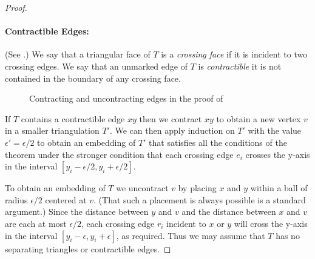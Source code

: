 \documentclass{patmorin}
\begin{document}
\begin{proof}
   \paragraph{Contractible Edges:}
   (See .)
   We say that a triangular face of $T$ is a \emph{crossing
   face} if it is incident to two crossing edges.  We say that an
   unmarked edge of $T$ is \emph{contractible} it is not contained
   in the boundary of any crossing face.  
   \begin{figure}
      \caption{Contracting and uncontracting edges in the proof of
      }
   \end{figure}

   If $T$ contains a contractible edge $xy$ then we contract $xy$ to
   obtain a new vertex $v$ in a smaller triangulation $T'$.   We can then apply
   induction on $T'$ with the value $\epsilon'=\epsilon/2$ to obtain an
   embedding of $T'$ that satisfies all the conditions of the theorem under
   the stronger condition that each crossing edge $e_i$ crosses
   the y-axis in the interval $[y_i-\epsilon/2,y_i+\epsilon/2]$.

   To obtain an embedding of $T$ we uncontract $v$ by placing $x$ and $y$
   within a ball of radius $\epsilon/2$ centered at $v$. (That such
   a placement is always possible is a standard argument.)  Since the
   distance between $y$ and $v$ and the distance between $x$ and $v$ are each at most $\epsilon/2$,
   each crossing edge $r_i$ incident to $x$ or $y$ will cross
   the y-axis in the interval $[y_i-\epsilon,y_i+\epsilon]$, as required.
   Thus we may assume that $T$ has no separating triangles or contractible
   edges.



\end{proof}
\end{document}
